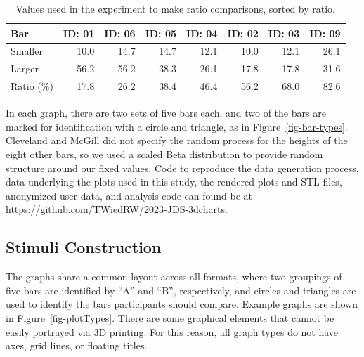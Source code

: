 \documentclass[phd]{nuthesis}
\begin{document}
\begin{table}

\caption{Values used in the experiment to make ratio comparisons, sorted by ratio.}
\centering
\begin{tabular}[t]{lrrrrrrr}
\toprule
Bar & ID: 01 & ID: 06 & ID: 05 & ID: 04 & ID: 02 & ID: 03 & ID: 09\\
\midrule
Smaller & 10.0 & 14.7 & 14.7 & 12.1 & 10.0 & 12.1 & 26.1\\
Larger & 56.2 & 56.2 & 38.3 & 26.1 & 17.8 & 17.8 & 31.6\\
Ratio (\%) & 17.8 & 26.2 & 38.4 & 46.4 & 56.2 & 68.0 & 82.6\\
\bottomrule
\end{tabular}
\end{table}

In each graph, there are two sets of five bars each, and two of the bars
are marked for identification with a circle and triangle, as in
Figure~\ref{fig-bar-types}. Cleveland and McGill did not specify the
random process for the heights of the eight other bars, so we used a
scaled Beta distribution to provide random structure around our fixed
values. Code to reproduce the data generation process, data underlying
the plots used in this study, the rendered plots and STL files,
anonymized user data, and analysis code can found be at
\url{https://github.com/TWiedRW/2023-JDS-3dcharts}.

\subsection{Stimuli Construction}\label{stimuli-construction}

The graphs share a common layout across all formats, where two groupings
of five bars are identified by ``A'' and ``B'', respectively, and
circles and triangles are used to identify the bars participants should
compare. Example graphs are shown in Figure~\ref{fig-plotTypes}. There
are some graphical elements that cannot be easily portrayed via 3D
printing. For this reason, all graph types do not have axes, grid lines,
or floating titles.
\end{document}
